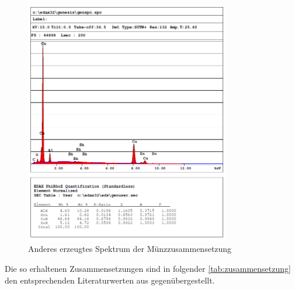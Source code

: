 \documentclass[12pt,english,ngerman]{scrartcl}
\begin{document}
\begin{figure}[H]
	\begin{center}
		\includegraphics[width =0.8\textwidth]{./figures/qualitativ2.png}
	\end{center}
	\caption{Anderes erzeugtes Spektrum der Münzzusammensetzung \cite{sein_foto}}
    \label{fig:qualitativ2}
\end{figure}

Die so erhaltenen Zusammensetzungen sind in folgender \autoref{tab:zusammensetzung} den entsprechenden Literaturwerten 
aus \cite{munzen} gegenübergestellt.
\end{document}
